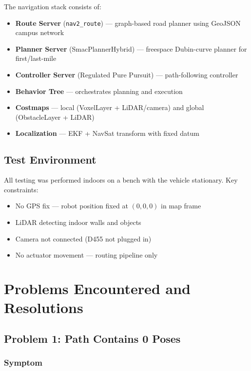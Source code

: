 \documentclass[11pt,a4paper]{article}
\begin{document}
The navigation stack consists of:
\begin{itemize}[noitemsep]
    \item \textbf{Route Server} (\texttt{nav2\_route}) --- graph-based road planner using GeoJSON campus network
    \item \textbf{Planner Server} (SmacPlannerHybrid) --- freespace Dubin-curve planner for first/last-mile
    \item \textbf{Controller Server} (Regulated Pure Pursuit) --- path-following controller
    \item \textbf{Behavior Tree} --- orchestrates planning and execution
    \item \textbf{Costmaps} --- local (VoxelLayer + LiDAR/camera) and global (ObstacleLayer + LiDAR)
    \item \textbf{Localization} --- EKF + NavSat transform with fixed datum
\end{itemize}

\subsection{Test Environment}

All testing was performed indoors on a bench with the vehicle stationary. Key constraints:
\begin{itemize}[noitemsep]
    \item No GPS fix --- robot position fixed at $(0, 0, 0)$ in map frame
    \item LiDAR detecting indoor walls and objects
    \item Camera not connected (D455 not plugged in)
    \item No actuator movement --- routing pipeline only
\end{itemize}

\section{Problems Encountered and Resolutions}

\subsection{Problem 1: Path Contains 0 Poses}

\subsubsection*{Symptom}
\end{document}
